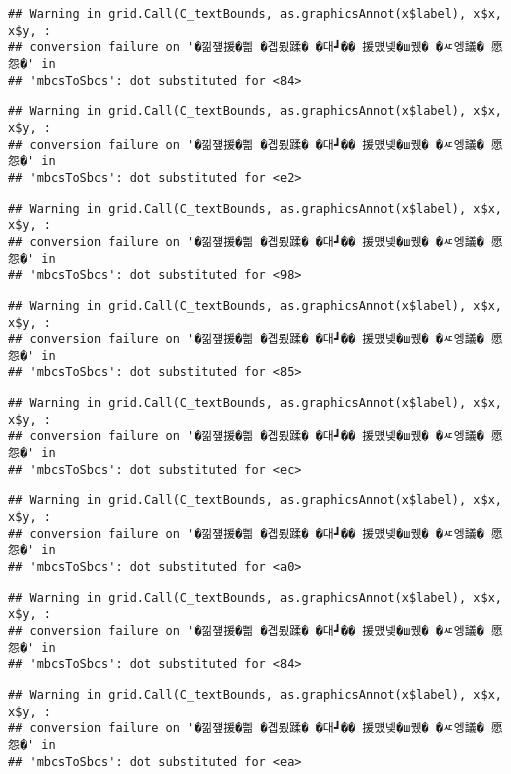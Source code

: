 \documentclass[
]{article}
\begin{document}
\begin{verbatim}
## Warning in grid.Call(C_textBounds, as.graphicsAnnot(x$label), x$x, x$y, :
## conversion failure on '�낆쟾援�쁾 �곕룄蹂� �대┛�� 援먰넻�ш퀬� �ㅼ엥議� 愿怨�' in
## 'mbcsToSbcs': dot substituted for <84>
\end{verbatim}

\begin{verbatim}
## Warning in grid.Call(C_textBounds, as.graphicsAnnot(x$label), x$x, x$y, :
## conversion failure on '�낆쟾援�쁾 �곕룄蹂� �대┛�� 援먰넻�ш퀬� �ㅼ엥議� 愿怨�' in
## 'mbcsToSbcs': dot substituted for <e2>
\end{verbatim}

\begin{verbatim}
## Warning in grid.Call(C_textBounds, as.graphicsAnnot(x$label), x$x, x$y, :
## conversion failure on '�낆쟾援�쁾 �곕룄蹂� �대┛�� 援먰넻�ш퀬� �ㅼ엥議� 愿怨�' in
## 'mbcsToSbcs': dot substituted for <98>
\end{verbatim}

\begin{verbatim}
## Warning in grid.Call(C_textBounds, as.graphicsAnnot(x$label), x$x, x$y, :
## conversion failure on '�낆쟾援�쁾 �곕룄蹂� �대┛�� 援먰넻�ш퀬� �ㅼ엥議� 愿怨�' in
## 'mbcsToSbcs': dot substituted for <85>
\end{verbatim}

\begin{verbatim}
## Warning in grid.Call(C_textBounds, as.graphicsAnnot(x$label), x$x, x$y, :
## conversion failure on '�낆쟾援�쁾 �곕룄蹂� �대┛�� 援먰넻�ш퀬� �ㅼ엥議� 愿怨�' in
## 'mbcsToSbcs': dot substituted for <ec>
\end{verbatim}

\begin{verbatim}
## Warning in grid.Call(C_textBounds, as.graphicsAnnot(x$label), x$x, x$y, :
## conversion failure on '�낆쟾援�쁾 �곕룄蹂� �대┛�� 援먰넻�ш퀬� �ㅼ엥議� 愿怨�' in
## 'mbcsToSbcs': dot substituted for <a0>
\end{verbatim}

\begin{verbatim}
## Warning in grid.Call(C_textBounds, as.graphicsAnnot(x$label), x$x, x$y, :
## conversion failure on '�낆쟾援�쁾 �곕룄蹂� �대┛�� 援먰넻�ш퀬� �ㅼ엥議� 愿怨�' in
## 'mbcsToSbcs': dot substituted for <84>
\end{verbatim}

\begin{verbatim}
## Warning in grid.Call(C_textBounds, as.graphicsAnnot(x$label), x$x, x$y, :
## conversion failure on '�낆쟾援�쁾 �곕룄蹂� �대┛�� 援먰넻�ш퀬� �ㅼ엥議� 愿怨�' in
## 'mbcsToSbcs': dot substituted for <ea>
\end{verbatim}
\end{document}
